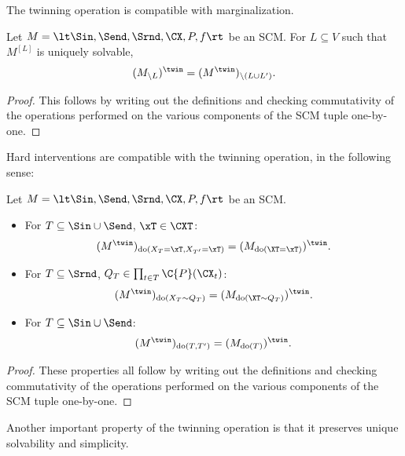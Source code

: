 The twinning operation is compatible with marginalization.
\begin{Prp}\label{prp:twinning_marginalization_commute}
Let $M = \lt \Sin, \Send, \Srnd, \CX, P, f \rt$ be an SCM.
For $L \subseteq V$ such that $M^{[L]}$ is uniquely solvable,
$$(M_{\setminus L})^\twin = (M^\twin)_{\setminus (L\cup L')}.$$
\end{Prp}
\begin{proof}
  This follows by writing out the definitions and checking commutativity of
  the operations performed on the various components of the SCM tuple one-by-one.
\end{proof}
Hard interventions are compatible with the twinning operation, in the following sense:
\begin{Prp}\label{prp:hard_interventions_twin_scm}
Let $M = \lt \Sin, \Send, \Srnd, \CX, P, f \rt$ be an SCM.
\begin{itemize}
  \item For $T \subseteq \Sin \cup \Send$, $\xT \in \CXT$:
    $$(M^\twin)_{\doit(X_T=\xT,X_{T'}=\xT)} = (M_{\doit(\XT=\xT)})^\twin.$$
  \item For $T \subseteq \Srnd$, $Q_T \in \prod_{t\in T} \C{P}(\CX_t)$:
    $$(M^\twin)_{\doit(X_T\sim Q_T)} = (M_{\doit(\XT\sim Q_T)})^\twin.$$
  \item For $T \subseteq \Sin \cup \Send$:
    $$(M^\twin)_{\doit(T,T')} = (M_{\doit(T)})^\twin.$$
\end{itemize}
\end{Prp}
\begin{proof}
  These properties all follow by writing out the definitions and checking commutativity of
  the operations performed on the various components of the SCM tuple one-by-one.
\end{proof}
Another important property of the twinning operation is that it preserves unique solvability and simplicity.
